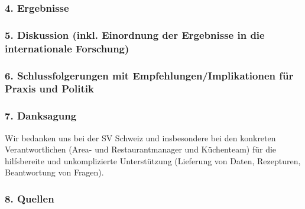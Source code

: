 \documentclass[12pt,ngerman,]{article}
\begin{document}
\hypertarget{ergebnisse}{%
\subsubsection{4. Ergebnisse}\label{ergebnisse}}

\hypertarget{diskussion-inkl.-einordnung-der-ergebnisse-in-die-internationale-forschung}{%
\subsubsection{5. Diskussion (inkl. Einordnung der Ergebnisse in die
internationale
Forschung)}\label{diskussion-inkl.-einordnung-der-ergebnisse-in-die-internationale-forschung}}

\hypertarget{schlussfolgerungen-mit-empfehlungenimplikationen-fur-praxis-und-politik}{%
\subsubsection{6. Schlussfolgerungen mit Empfehlungen/Implikationen für
Praxis und
Politik}\label{schlussfolgerungen-mit-empfehlungenimplikationen-fur-praxis-und-politik}}

\hypertarget{danksagung}{%
\subsubsection{7. Danksagung}\label{danksagung}}

Wir bedanken uns bei der SV Schweiz und insbesondere bei den konkreten
Verantwortlichen (Area- und Restaurantmanager und Küchenteam) für die
hilfsbereite und unkomplizierte Unterstützung (Lieferung von Daten,
Rezepturen, Beantwortung von Fragen).

\hypertarget{quellen}{%
\subsubsection{8. Quellen}\label{quellen}}
\end{document}
